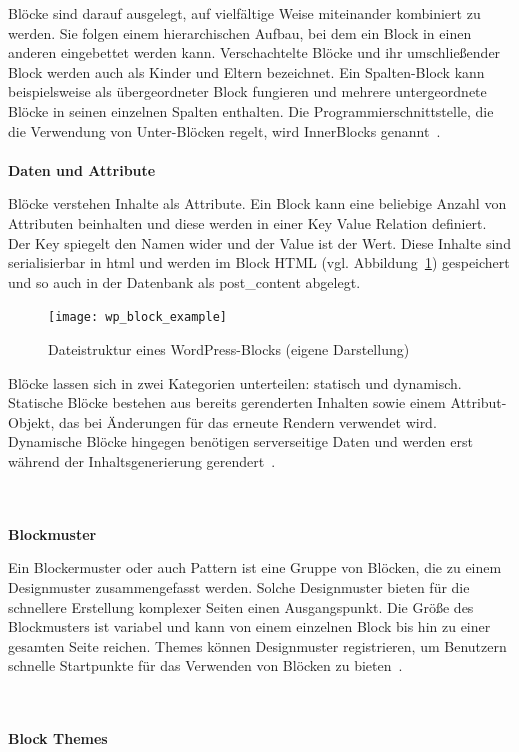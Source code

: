 Blöcke sind darauf ausgelegt, auf vielfältige Weise miteinander kombiniert zu werden.
Sie folgen einem hierarchischen Aufbau, bei dem ein Block in einen anderen eingebettet werden kann.
Verschachtelte Blöcke und ihr umschließender Block werden auch als Kinder und Eltern bezeichnet.
Ein Spalten-Block kann beispielsweise als übergeordneter Block fungieren und mehrere untergeordnete Blöcke in seinen einzelnen Spalten enthalten.
Die Programmierschnittstelle, die die Verwendung von Unter-Blöcken regelt, wird InnerBlocks genannt~\cite{wordpress2024combination}.
\\\\
\textbf{Daten und Attribute}

Blöcke verstehen Inhalte als Attribute.
Ein Block kann eine beliebige Anzahl von Attributen beinhalten und diese werden in einer Key Value Relation definiert.
Der Key spiegelt den Namen wider und der Value ist der Wert.
Diese Inhalte sind serialisierbar in \gls{html} und werden im Block HTML (vgl. Abbildung~\ref{fig:wp-block-example}) gespeichert und so auch in der Datenbank als post\_content abgelegt.
\begin{figure}[H]
    \centering
    \texttt{[image: wp\_block\_example]}
    \caption{Dateistruktur eines WordPress-Blocks (eigene Darstellung)}
    \label{fig:wp-block-example}
\end{figure}

Blöcke lassen sich in zwei Kategorien unterteilen: statisch und dynamisch.
Statische Blöcke bestehen aus bereits gerenderten Inhalten sowie einem Attribut-Objekt, das bei Änderungen für das erneute Rendern verwendet wird.
Dynamische Blöcke hingegen benötigen serverseitige Daten und werden erst während der Inhaltsgenerierung gerendert~\cite{wordpress2024dataflow}.




\\\\
\textbf{Blockmuster}

Ein Blockermuster oder auch Pattern ist eine Gruppe von Blöcken, die zu einem Designmuster zusammengefasst werden.
Solche Designmuster bieten für die schnellere Erstellung komplexer Seiten einen Ausgangspunkt.
Die Größe des Blockmusters ist variabel und kann von einem einzelnen Block bis hin zu einer gesamten Seite reichen.
Themes können Designmuster registrieren, um Benutzern schnelle Startpunkte für das Verwenden von Blöcken zu bieten~\cite{wordpress2024blockpattern}.

\\\\
\textbf{Block Themes}

